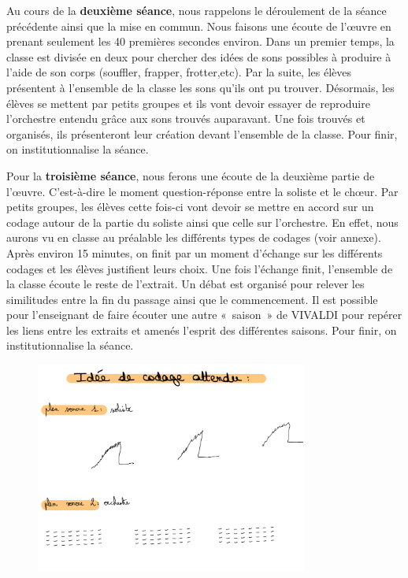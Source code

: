 \documentclass[12pt]{article}
\begin{document}
Au cours de la \textbf{deuxième séance}, nous rappelons le déroulement de la séance précédente ainsi que la mise en commun. Nous faisons une écoute de l’œuvre en prenant seulement les 40 premières secondes environ. Dans un premier temps, la classe est divisée en deux pour chercher des idées de sons possibles à produire à l’aide de son corps (souffler, frapper, frotter,etc). Par la suite, les élèves présentent à l’ensemble de la classe les sons qu’ils ont pu trouver. Désormais, les élèves se mettent par petits groupes et ils vont devoir essayer de reproduire l’orchestre entendu grâce aux sons trouvés auparavant. Une fois trouvés et organisés, ils présenteront leur création devant l’ensemble de la classe. Pour finir, on institutionnalise la séance.

Pour la \textbf{troisième séance}, nous ferons une écoute de la deuxième partie de l’œuvre. 
C'est-à-dire le moment question-réponse entre la soliste et le chœur. 
Par petits groupes, les élèves cette fois-ci vont devoir se mettre en accord sur un codage autour de la partie 
du soliste ainsi que celle sur l’orchestre. 
En effet, nous aurons vu en classe au préalable les différents types de codages (voir annexe).
Après environ 15 minutes, on finit par un moment d’échange sur les 
différents codages et les élèves justifient leurs choix. Une fois l’échange finit, l’ensemble de la classe écoute 
le reste de l’extrait. Un débat est organisé pour relever les similitudes entre la fin du passage ainsi que 
le commencement. Il est possible pour l’enseignant de faire écouter une autre « saison » de VIVALDI pour repérer 
les liens entre les extraits et amenés l’esprit des différentes saisons. Pour finir, on institutionnalise la séance.

\begin{figure}
    \centering
    \includegraphics[width=0.8\textwidth]{./images/idee_codage.png}
\end{figure}
\end{document}

